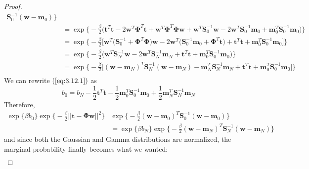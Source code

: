 \begin{proof}
\begin{align*}
             \mathbf{S}_0^{-1}(\mathbf{w} - \mathbf{m}_0)
         \bigg\} \\
        &= \exp\bigg\{-\frac{\beta}{2}\big(
        \mathbf{t}^T\mathbf{t} 
        - 2\mathbf{w}^T \mathbf{\Phi}^T \mathbf{t}
        + \mathbf{w}^T\mathbf{\Phi}^T\mathbf{\Phi}\mathbf{w}
        + \mathbf{w}^T\mathbf{S}_0^{-1}\mathbf{w}
        - 2 \mathbf{w}^T\mathbf{S}_0^{-1}\mathbf{m}_0
        + \mathbf{m}_0^T\mathbf{S}_0^{-1}\mathbf{m}_0\big)\bigg\} \\
        &= \exp\bigg\{-\frac{\beta}{2}\big[
        \mathbf{w}^T\big(\mathbf{S}_0^{-1} 
            + \mathbf{\Phi}^T\mathbf{\Phi}\big)\mathbf{w}
        - 2\mathbf{w}^T\big(\mathbf{S}_0^{-1}\mathbf{m}_0\big 
            + \mathbf{\Phi}^T\mathbf{t}\big) 
        + \mathbf{t}^T\mathbf{t}
        + \mathbf{m}_0^T\mathbf{S}_0^{-1}\mathbf{m}_0\big]\bigg\} \\
        &= \exp\bigg\{-\frac{\beta}{2}\big(
        \mathbf{w}^T\mathbf{S}_N^{-1}\mathbf{w} 
        - 2\mathbf{w}^T\mathbf{S}_N^{-1}\mathbf{m}_N
        + \mathbf{t}^T\mathbf{t}
        + \mathbf{m}_0^T\mathbf{S}_0^{-1}\mathbf{m}_0\big)\bigg\} \\
        &= \exp\bigg\{-\frac{\beta}{2}\big[
        (\mathbf{w} - \mathbf{m}_N)^T\mathbf{S}_N^{-1}(\mathbf{w} - \mathbf{m}_N)
        -\mathbf{m}_N^T\mathbf{S}_N^{-1}\mathbf{m}_N
        + \mathbf{t}^T\mathbf{t}
        + \mathbf{m}_0^T\mathbf{S}_0^{-1}\mathbf{m}_0\big]\bigg\} \\
    \end{align*}
    We can rewrite $(\ref{eq:3.12.1})$ as
    \[
        b_0 = b_N - \frac{1}{2} \mathbf{t}^T\mathbf{t} 
        - \frac{1}{2} \mathbf{m}_0^T\mathbf{S}_0^{-1}\mathbf{m}_0 
        + \frac{1}{2} \mathbf{m}_N^T\mathbf{S}_N^{-1}\mathbf{m}_N
    \]
    Therefore, 
    \begin{align*}
        \exp\{\beta b_0\}
         \exp\bigg\{-\frac{\beta}{2} ||\mathbf{t} - \mathbf{\Phi}\mathbf{w}||^2\bigg\}
         &\exp\bigg\{-\frac{\beta}{2}(\mathbf{w} - \mathbf{m}_0)^T
             \mathbf{S}_0^{-1}(\mathbf{w} - \mathbf{m}_0)
         \bigg\} \\
         &= \exp\{\beta b_N\}\exp\bigg\{-\frac{\beta}{2} 
            (\mathbf{w} - \mathbf{m}_N)^T\mathbf{S}_N^{-1}(\mathbf{w} - \mathbf{m}_N)\bigg\}
    \end{align*}
    and since both the Gaussian and Gamma distributions
    are normalized, the marginal probability finally becomes
    what we wanted:
    \begin{align*}

\end{align*}
\end{proof}

